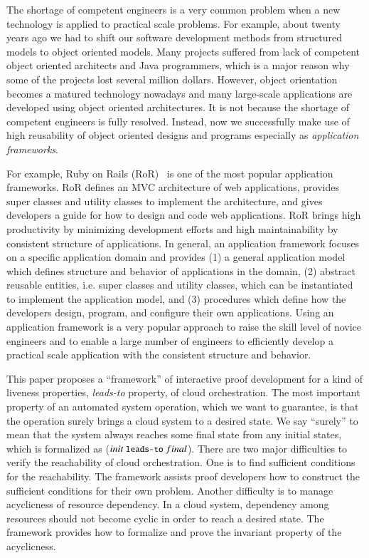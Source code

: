 \documentclass[12pt]{report}
\newcommand{\mbstt}[1]{\mbox{\small{\tt {#1}}}}
\begin{document}
The shortage of competent engineers is a very common problem when a new
technology is applied to practical scale problems. For example, about
twenty years ago we had to shift our software development methods from
structured models to object oriented models. Many projects suffered
from lack of competent object oriented architects and Java programmers,
which is a major reason why some of the projects lost several million
dollars. However, object orientation becomes a matured technology
nowadays and many large-scale applications are developed using object
oriented architectures. It is not because the shortage of competent
engineers is fully resolved.  Instead, now we successfully make use of
high reusability of object oriented designs and programs especially as
{\it application frameworks}.

For example, Ruby on Rails (RoR)~\cite{RoR} is one of the most popular
application frameworks. RoR defines an MVC architecture of web
applications, provides super classes and utility classes to implement
the architecture, and gives developers a guide for how to design and
code web applications. RoR brings high productivity by minimizing
development efforts and high maintainability by consistent structure
of applications.  In general, an application framework focuses on a
specific application domain and provides (1) a general application
model which defines structure and behavior of applications in the
domain, (2) abstract reusable entities, i.e. super classes and
utility classes, which can be instantiated to implement the
application model, and (3) procedures which define how the developers
design, program, and configure their own applications. Using an
application framework is a very popular approach to raise the skill
level of novice engineers and to enable a large number of engineers to
efficiently develop a practical scale application with the consistent
structure and behavior.

This paper proposes a ``framework'' of interactive proof development
for a kind of liveness properties, {\it leads-to} property, of cloud
orchestration. The most important property of an automated system
operation, which we want to guarantee, is that the operation surely
brings a cloud system to a desired state.  We say ``surely'' to mean
that the system always reaches some final state from any initial
states, which is formalized as ($init~\mbstt{leads-to}~final$).  There
are two major difficulties to verify the reachability of cloud
orchestration.  One is to find sufficient conditions for the
reachability. The framework assists proof developers how to construct
the sufficient conditions for their own problem.  Another difficulty
is to manage acyclicness of resource dependency.  In a cloud system,
dependency among resources should not become cyclic in order to reach
a desired state. The framework provides how to formalize and prove the
invariant property of the acyclicness.
\end{document}
